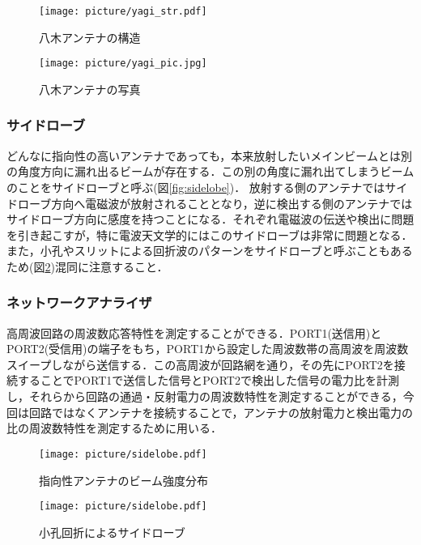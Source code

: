 \documentclass[a4j,10pt,oneside,openany]{jsbook}
\begin{document}
{\begin{figure}[htbp]
  \begin{minipage}{0.5\hsize}
    \begin{center}
      \texttt{[image: picture/yagi\_str.pdf]}
    \end{center}
    \caption{八木アンテナの構造}
    \label{fig:yagi_str}
  \end{minipage}
  \begin{minipage}{0.5\hsize}
    \begin{center}
      \texttt{[image: picture/yagi\_pic.jpg]}
    \end{center}
    \caption{八木アンテナの写真\cite{pic2}}
    \label{fig:yagi_pic}
  \end{minipage}
\end{figure}

\subsubsection{サイドローブ}
どんなに指向性の高いアンテナであっても，本来放射したいメインビームとは別の角度方向に漏れ出るビームが存在する．この別の角度に漏れ出てしまうビームのことをサイドローブと呼ぶ(図\ref{fig:sidelobe})．
放射する側のアンテナではサイドローブ方向へ電磁波が放射されることとなり，逆に検出する側のアンテナではサイドローブ方向に感度を持つことになる．それぞれ電磁波の伝送や検出に問題を引き起こすが，特に電波天文学的にはこのサイドローブは非常に問題となる．
また，小孔やスリットによる回折波のパターンをサイドローブと呼ぶこともあるため(図\ref{fig:lobe_apt})混同に注意すること．

\subsubsection{ネットワークアナライザ}
高周波回路の周波数応答特性を測定することができる．PORT1(送信用)とPORT2(受信用)の端子をもち，PORT1から設定した周波数帯の高周波を周波数スイープしながら送信する．この高周波が回路網を通り，その先にPORT2を接続することでPORT1で送信した信号とPORT2で検出した信号の電力比を計測し，それらから回路の通過・反射電力の周波数特性を測定することができる，今回は回路ではなくアンテナを接続することで，アンテナの放射電力と検出電力の比の周波数特性を測定するために用いる．

\begin{figure}[htbp]
  \begin{minipage}{0.5\hsize}
    \begin{center}
      \texttt{[image: picture/sidelobe.pdf]}
    \end{center}
    \caption{指向性アンテナのビーム強度分布}
    \label{fig:sidelobe}
  \end{minipage}
  \begin{minipage}{0.5\hsize}
    \begin{center}
      \texttt{[image: picture/sidelobe.pdf]}
    \end{center}
    \caption{小孔回折によるサイドローブ}
    \label{fig:lobe_apt}
  \end{minipage}
\end{figure}

}
\end{document}

